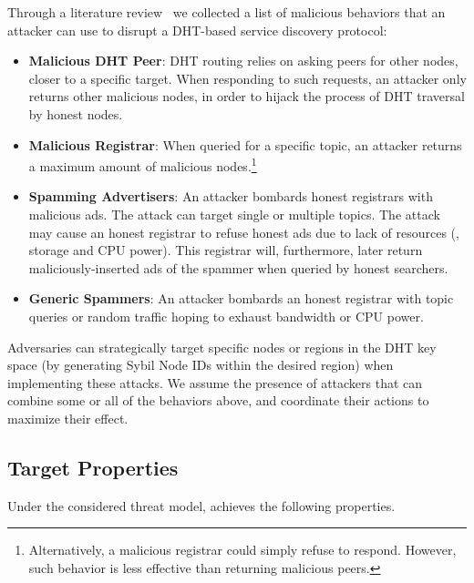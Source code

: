 Through a literature review~\cite{chen2020survey, henningsen2019eclipsing} we collected a list of malicious behaviors that an attacker can use to disrupt a DHT-based service discovery protocol:
\begin{itemize}
    \item \textbf{Malicious DHT Peer}: DHT routing relies on asking peers for other nodes, closer to a specific target. When responding to such requests, an attacker only returns other malicious nodes, in order to hijack the process of DHT traversal by honest nodes.  
    \item \textbf{Malicious Registrar}: When queried for a specific topic, an attacker returns a maximum amount of malicious nodes.\footnote{Alternatively, a malicious registrar could simply refuse to respond. However, such behavior is less effective than returning malicious peers.}
    \item \textbf{Spamming Advertisers}: An attacker bombards honest registrars with malicious ads. The attack can target single or multiple topics. The attack may cause an honest registrar to refuse honest ads due to lack of resources (\eg, storage and CPU power). This registrar will, furthermore, later return maliciously-inserted ads of the spammer when queried by honest searchers. 
    \item \textbf{Generic Spammers}: An attacker bombards an honest registrar with topic queries or random traffic hoping to exhaust bandwidth or CPU power.
\end{itemize}

Adversaries can strategically target specific nodes or regions in the DHT key space (\ie by generating Sybil Node IDs within the desired region) when implementing these attacks.
We assume the presence of attackers that can combine some or all of the behaviors above, and coordinate their actions to maximize their effect. 

\subsection{Target Properties}

Under the considered threat model, \sysname achieves the following properties.

